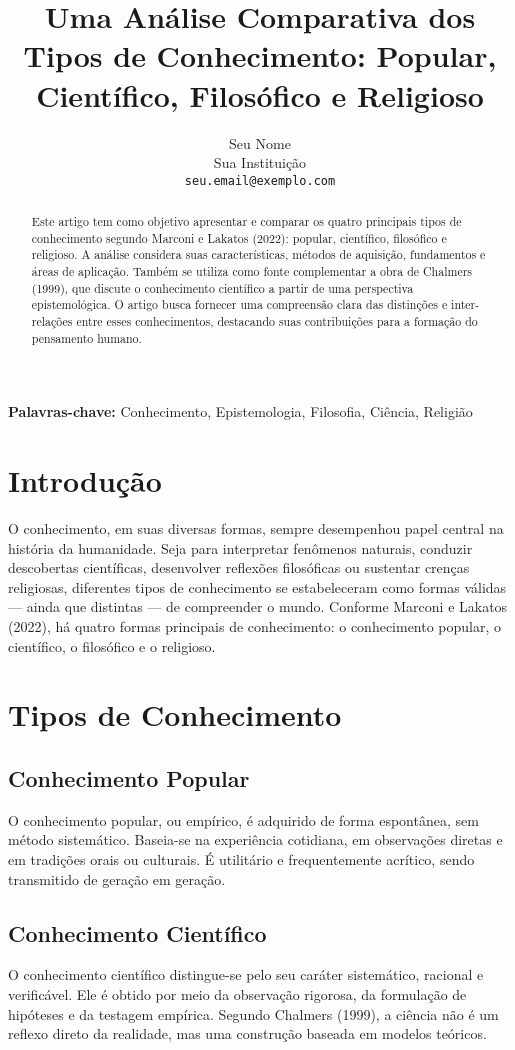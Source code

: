 \documentclass[10pt]{article}
\title{Uma Análise Comparativa dos Tipos de Conhecimento: Popular, Científico, Filosófico e Religioso}
\author{Seu Nome \\ Sua Instituição \\ \texttt{seu.email@exemplo.com}}
\date{}
\begin{document}
\maketitle

\begin{abstract}
Este artigo tem como objetivo apresentar e comparar os quatro principais tipos de conhecimento segundo Marconi e Lakatos (2022): popular, científico, filosófico e religioso. A análise considera suas características, métodos de aquisição, fundamentos e áreas de aplicação. Também se utiliza como fonte complementar a obra de Chalmers (1999), que discute o conhecimento científico a partir de uma perspectiva epistemológica. O artigo busca fornecer uma compreensão clara das distinções e inter-relações entre esses conhecimentos, destacando suas contribuições para a formação do pensamento humano.
\end{abstract}

\textbf{Palavras-chave:} Conhecimento, Epistemologia, Filosofia, Ciência, Religião

\section{Introdução}
O conhecimento, em suas diversas formas, sempre desempenhou papel central na história da humanidade. Seja para interpretar fenômenos naturais, conduzir descobertas científicas, desenvolver reflexões filosóficas ou sustentar crenças religiosas, diferentes tipos de conhecimento se estabeleceram como formas válidas --- ainda que distintas --- de compreender o mundo. Conforme Marconi e Lakatos (2022), há quatro formas principais de conhecimento: o conhecimento popular, o científico, o filosófico e o religioso.

\section{Tipos de Conhecimento}

\subsection{Conhecimento Popular}
O conhecimento popular, ou empírico, é adquirido de forma espontânea, sem método sistemático. Baseia-se na experiência cotidiana, em observações diretas e em tradições orais ou culturais. É utilitário e frequentemente acrítico, sendo transmitido de geração em geração.

\subsection{Conhecimento Científico}
O conhecimento científico distingue-se pelo seu caráter sistemático, racional e verificável. Ele é obtido por meio da observação rigorosa, da formulação de hipóteses e da testagem empírica. Segundo Chalmers (1999), a ciência não é um reflexo direto da realidade, mas uma construção baseada em modelos teóricos.
\end{document}
